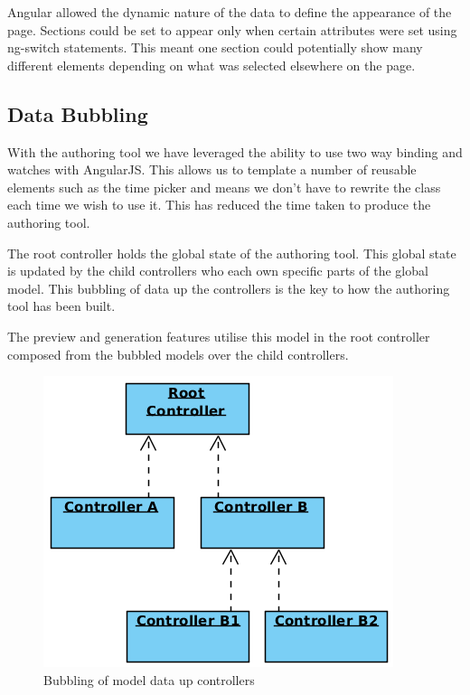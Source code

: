 Angular allowed the dynamic nature of the data to define the appearance of the page. Sections could be set to appear only when certain attributes were set using ng-switch statements. This meant one section could potentially show many different elements depending on what was selected elsewhere on the page.

\subsection{Data Bubbling}
\label{Section:Authoring_Data_bubbling}

With the authoring tool we have leveraged the ability to use two way binding and watches with AngularJS. This allows us to template a number of reusable elements such as the time picker and means we don't have to rewrite the class each time we wish to use it. This has reduced the time taken to produce the authoring tool.

The root controller holds the global state of the authoring tool. This global state is updated by the child controllers who each own specific parts of the global model. This bubbling of data up the controllers is the key to how the authoring tool has been built.

The preview and generation features utilise this model in the root controller composed from the bubbled models over the child controllers.

\begin{figure}[h]
	\centering
		\includegraphics[scale=0.4]{../figures/authoring_tool/controller_bubbling.png} 		
	\caption{\label{Figure: Bubbling model data} Bubbling of model data up controllers} 	
\end{figure}

